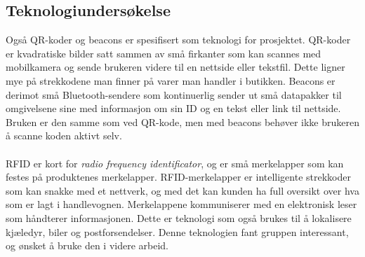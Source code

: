 \subsection{Teknologiundersøkelse}
\label{teknologiundersokelse}
Også QR-koder og beacons er spesifisert som teknologi for prosjektet. QR-koder er kvadratiske bilder satt sammen av små firkanter som kan scannes med mobilkamera og sende brukeren videre til en nettside eller tekstfil\cite{prosjektoppgaven}. Dette ligner mye på strekkodene man finner på varer man handler i butikken. Beacons er derimot små Bluetooth-sendere som kontinuerlig sender ut små datapakker til omgivelsene sine med informasjon om sin ID og en tekst eller link til nettside\cite{prosjektoppgaven}. Bruken er den samme som ved QR-kode, men med beacons behøver ikke brukeren å scanne koden aktivt selv.
\\\\
RFID er kort for \textit{radio frequency identificator}, og er små merkelapper som kan festes på produktenes merkelapper\cite{rfid}. RFID-merkelapper er intelligente strekkoder som kan snakke med et nettverk, og med det kan kunden ha full oversikt over hva som er lagt i handlevognen. Merkelappene kommuniserer med en elektronisk leser som håndterer informasjonen. Dette er teknologi som også brukes til å lokalisere kjæledyr, biler og postforsendelser. Denne teknologien fant gruppen interessant, og ønsket å bruke den i videre arbeid.

 
 


